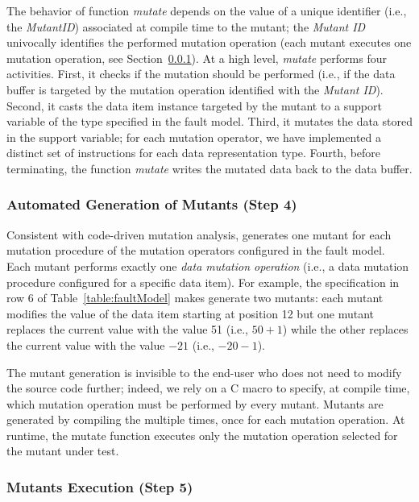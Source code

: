 The behavior of function \emph{mutate} depends on the value of a unique identifier (i.e., the \emph{MutantID}) associated at compile time to the mutant; the \emph{Mutant ID} univocally identifies the performed mutation operation (each mutant executes one mutation operation, see Section~\ref{sec:mutantsGeneration}).
At a high level, \emph{mutate} performs four activities. First, it checks if the mutation should be performed (i.e., if the data buffer is targeted by the mutation operation identified with the \emph{Mutant ID}). Second, it casts the data item instance targeted by the mutant to a support variable of the type specified in the fault model. Third, it mutates the data stored in the support variable; for each mutation operator, we have implemented a distinct set of instructions for each data representation type. Fourth, before terminating, the function \emph{mutate} writes the mutated data back to the data buffer.





\subsubsection{Automated Generation of Mutants (Step 4)}
\label{sec:mutantsGeneration}



Consistent with code-driven mutation analysis, \APPR generates one mutant for each mutation procedure of the mutation operators configured in the fault model. Each mutant performs exactly one \emph{data mutation operation} (i.e., a data mutation procedure configured for a specific data item). For example, the specification in row 6 of Table~\ref{table:faultModel} makes \APPR generate two mutants: each mutant modifies the value of the data item starting at position 12 but one mutant replaces the current value with the value 51 (i.e., $50+1$) while the other replaces the current value with the value $-21$ (i.e., $-20 -1$).

The mutant generation is invisible to the end-user who does not need to modify the source code further; indeed, we rely on a C macro to specify, at compile time, which mutation operation must be performed by every mutant. Mutants are generated by compiling the  multiple times, once for each mutation operation. At runtime, the mutate function executes only the mutation operation selected for the mutant under test.

\subsubsection{Mutants Execution (Step 5)}
\label{sec:mutantsExecution}

